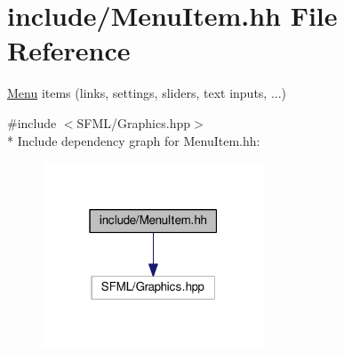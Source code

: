 \hypertarget{MenuItem_8hh}{}\section{include/\+Menu\+Item.hh File Reference}
\label{MenuItem_8hh}


\hyperlink{classMenu}{Menu} items (links, settings, sliders, text inputs, ...)  


{\ttfamily \#include $<$S\+F\+M\+L/\+Graphics.\+hpp$>$}\\*
Include dependency graph for Menu\+Item.\+hh\+:\nopagebreak
\begin{figure}[H]
\begin{center}
\leavevmode
\includegraphics[width=187pt]{MenuItem_8hh__incl}
\end{center}
\end{figure}
